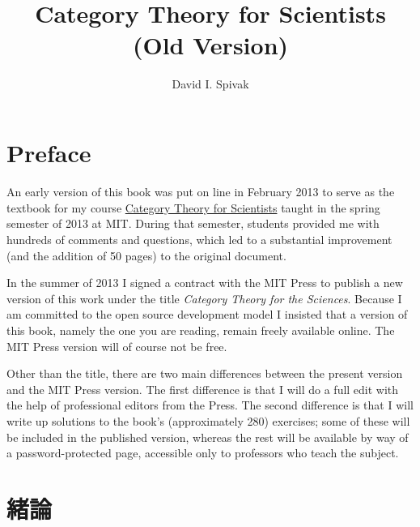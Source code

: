 \documentclass[a4paper]{ltjsbook}
\theoremstyle{remark}
\theoremstyle{definition}
\begin{document}
\title{~\\~\\Category Theory for Scientists\\(Old Version)}
\author{David I. Spivak}
\maketitle


\chapter*{Preface}

An early version of this book was put on line in February 2013 to serve as the textbook for my course \href{http://math.mit.edu/~dspivak/teaching/sp13/}{\text Category Theory for Scientists} taught in the spring semester of 2013 at MIT. During that semester, students provided me with hundreds of comments and questions, which led to a substantial improvement (and the addition of 50 pages) to the original document. 

In the summer of 2013 I signed a contract with the MIT Press to publish a new version of this work under the title {\em Category Theory for the Sciences}. Because I am committed to the open source development model I insisted that a version of this book, namely the one you are reading, remain freely available online. The MIT Press version will of course not be free.

Other than the title, there are two main differences between the present version and the MIT Press version. The first difference is that I will do a full edit with the help of professional editors from the Press. The second difference is that I will write up solutions to the book's (approximately 280) exercises; some of these will be included in the published version, whereas the rest will be available by way of a password-protected page, accessible only to professors who teach the subject.

\tableofcontents


\chapter{緒論}
\end{document}
